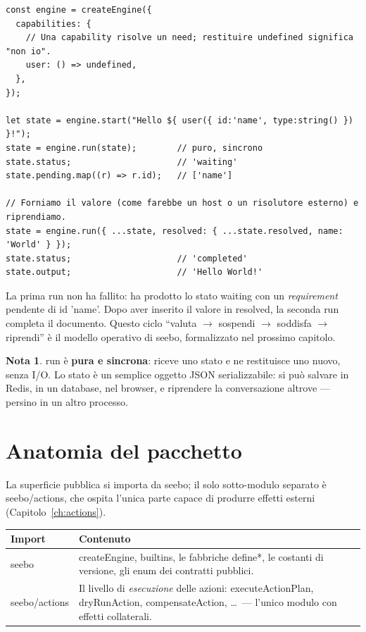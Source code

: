 \documentclass[11pt,a4paper]{book}
\newcommand{\ic}[1]{{\ttfamily #1}}
\theoremstyle{definition}
\newtheorem*{nota}{Nota}
\newcommand{\seebo}{\textsf{seebo}}
\begin{document}
\begin{lstlisting}
const engine = createEngine({
  capabilities: {
    // Una capability risolve un need; restituire undefined significa "non io".
    user: () => undefined,
  },
});

let state = engine.start("Hello ${ user({ id:'name', type:string() }) }!");
state = engine.run(state);        // puro, sincrono
state.status;                     // 'waiting'
state.pending.map((r) => r.id);   // ['name']

// Forniamo il valore (come farebbe un host o un risolutore esterno) e riprendiamo.
state = engine.run({ ...state, resolved: { ...state.resolved, name: 'World' } });
state.status;                     // 'completed'
state.output;                     // 'Hello World!'
\end{lstlisting}

La prima \ic{run} non ha fallito: ha prodotto lo stato \ic{waiting} con un
\emph{requirement} pendente di \ic{id} \ic{'name'}. Dopo aver inserito il valore
in \ic{resolved}, la seconda \ic{run} completa il documento. Questo ciclo
``valuta $\rightarrow$ sospendi $\rightarrow$ soddisfa $\rightarrow$ riprendi'' è
il modello operativo di \seebo, formalizzato nel prossimo capitolo.

\begin{nota}
\ic{run} è \textbf{pura e sincrona}: riceve uno stato e ne restituisce uno nuovo,
senza I/O. Lo stato è un semplice oggetto JSON serializzabile: si può salvare in
Redis, in un database, nel browser, e riprendere la conversazione altrove ---
persino in un altro processo.
\end{nota}

\section{Anatomia del pacchetto}

La superficie pubblica si importa da \ic{seebo}; il solo sotto-modulo separato è
\ic{seebo/actions}, che ospita l'unica parte capace di produrre effetti esterni
(Capitolo~\ref{ch:actions}).

\begin{center}
\small
\begin{tabularx}{\linewidth}{@{}lX@{}}
\toprule
\textbf{Import} & \textbf{Contenuto} \\
\midrule
\ic{seebo} & \ic{createEngine}, \ic{builtins}, le fabbriche \ic{define*}, le
costanti di versione, gli enum dei contratti pubblici. \\
\ic{seebo/actions} & Il livello di \emph{esecuzione} delle azioni:
\ic{executeActionPlan}, \ic{dryRunAction}, \ic{compensateAction}, \ldots\ ---
l'unico modulo con effetti collaterali. \\
\bottomrule
\end{tabularx}
\end{center}
\end{document}
